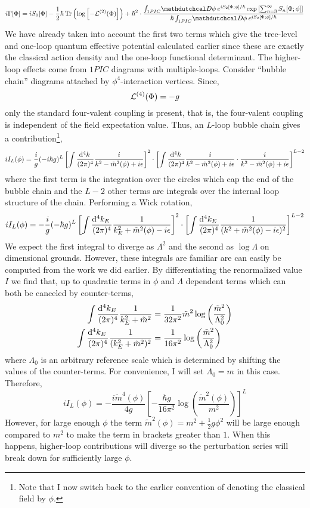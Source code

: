 \documentclass[12pt]{article}
\begin{document}
\[ i \Gamma[\Phi] = i S_0[\Phi] - \frac{1}{2} \hbar \, \Tr{\log{\left[ -  \lagrange^{(2)}(\Phi) \right]}} + \hbar^2 \cdot \frac{\int_{1PIC} \pathd{\phi} e^{i S_2[\Phi ; \phi] / \hbar} \exp{\left[ \sum_{n = 3}^{\infty} S_n[\Phi ; \phi] \right]}}{\hbar \int_{1PIC} \pathd{\phi} e^{i S_2[\Phi ; \phi] / \hbar}} \]
We have already taken into account the first two terms which give the tree-level and one-loop quantum effective potential calculated earlier since these are exactly the classical action density and the one-loop functional determinant. The higher-loop effects come from $1PIC$ diagrams with multiple-loops. Consider ``bubble chain'' diagrams attached by $\phi^4$-interaction vertices. Since,
\[ \mathcal{L}^{(4)}(\Phi) = - g \]
only the standard four-valent coupling is present, that is, the four-valent coupling is independent of the field expectation value. Thus, an $L$-loop bubble chain gives a contribution\footnote{Note that I now switch back to the earlier convention of denoting the classical field by $\phi$.},
\[ iI_L(\phi) = \frac{i}{g} (-i \hbar g)^L \left[ \int \frac{\mathrm{d}^{4} k \:}{(2 \pi)^4} \frac{i}{k^2 - \tilde{m}^2(\phi) + i \epsilon} \right]^2 \cdot \left[ \int \frac{\mathrm{d}^{4} k \:}{(2 \pi)^4} \frac{i}{k^2 - \tilde{m}^2(\phi) + i \epsilon} \cdot \frac{i}{k^2 - \tilde{m}^2(\phi) + i \epsilon} \right]^{L-2}  \]
where the first term is the integration over the circles which cap the end of the bubble chain and the $L-2$ other terms are integrals over the internal loop structure of the chain. Performing a Wick rotation, 
\[ iI_L(\phi) = -\frac{i}{g} (-\hbar g)^L \left[ \int \frac{\mathrm{d}^{4} k_E \:}{(2 \pi)^4} \frac{1}{k^2_E + \tilde{m}^2(\phi) - i \epsilon} \right]^2 \cdot \left[ \int \frac{\mathrm{d}^{4} k_E \:}{(2 \pi)^4} \frac{1}{(k^2 + \tilde{m}^2(\phi) - i \epsilon)^2}  \right]^{L-2}  \]
We expect the first integral to diverge as $\Lambda^2$ and the second as $\log{\Lambda}$ on dimensional grounds. 
However, these integrals are familiar are can easily be computed from the work we did earlier. By differentiating the renormalized value $I$ we find that, up to quadratic terms in $\phi$ and $\Lambda$ dependent terms which can both be canceled by counter-terms,
\begin{align*}
\int \frac{\mathrm{d}^{4} k_E \:}{(2 \pi)^4} \frac{1}{k^2_E + \tilde{m}^2} & = \frac{1}{32 \pi^2} \tilde{m}^2 \log{\left( \frac{\tilde{m}^2}{\Lambda_0^2} \right)}
\\
\int \frac{\mathrm{d}^{4} k_E \:}{(2 \pi)^4} \frac{1}{(k^2_E + \tilde{m}^2)^2} & = \frac{1}{16 \pi^2} \log{\left( \frac{\tilde{m}^2}{\Lambda_0^2} \right)}
\end{align*}
where $\Lambda_0$ is an arbitrary reference scale which is determined by shifting the values of the counter-terms. For convenience, I will set $\Lambda_0 = m$ in this case. Therefore,
\[ iI_L(\phi) = -\frac{i \tilde{m}^4(\phi)}{4 g} \left[ -\frac{\hbar g}{16 \pi^2} \log{\left( \frac{\tilde{m}^2(\phi)}{m^2} \right)} \right]^L \] 
However, for large enough $\phi$ the term $\tilde{m}^2(\phi) = m^2 + \tfrac{1}{2} g \phi^2$ will be large enough compared to $m^2$ to make the term in brackets greater than $1$. When this happens, higher-loop contributions will diverge so the perturbation series will break down for sufficiently large $\phi$. 
\end{document}
